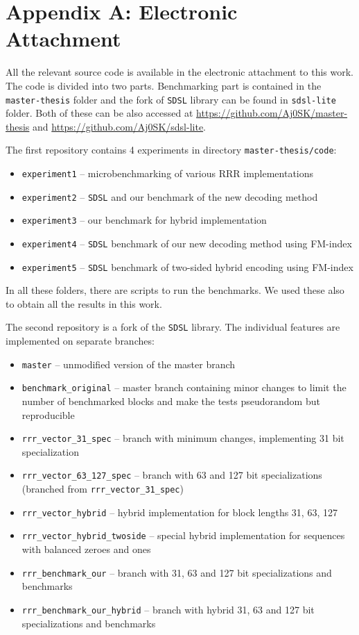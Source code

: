 \chapter*{Appendix A: Electronic Attachment}
\label{kap:kapAppendixA}

All the relevant source code is available in the electronic attachment to this work.
The code is divided into two parts. Benchmarking part is contained in the \verb!master-thesis!
folder and the fork of \texttt{SDSL} library can be found in \verb!sdsl-lite! folder.
Both of these can be also accessed at \url{https://github.com/Aj0SK/master-thesis} and
\url{https://github.com/Aj0SK/sdsl-lite}.

The first repository contains 4 experiments in directory \texttt{master-thesis/code}:
\begin{itemize}
    \item \texttt{experiment1} -- microbenchmarking of various RRR implementations
    \item \texttt{experiment2} -- \texttt{SDSL} and our benchmark of the new decoding method
    \item \texttt{experiment3} -- our benchmark for hybrid implementation
    \item \texttt{experiment4} -- \texttt{SDSL} benchmark of our new decoding method using FM-index
    \item \texttt{experiment5} -- \texttt{SDSL} benchmark of two-sided hybrid encoding using FM-index
\end{itemize}
In all these folders, there are scripts to run the benchmarks. We used these also to obtain
all the results in this work. 

The second repository is a fork of the \texttt{SDSL} library. The individual features are implemented
on separate branches:
\begin{itemize}
    \item \texttt{master} -- unmodified version of the master branch
    \item \texttt{benchmark\_original} -- master branch containing minor changes
        to limit the number of benchmarked blocks and make the tests pseudorandom but reproducible
    \item \texttt{rrr\_vector\_31\_spec} -- branch with minimum changes, implementing 31 bit specialization
    \item \texttt{rrr\_vector\_63\_127\_spec} -- branch with 63 and 127 bit specializations (branched from \texttt{rrr\_vector\_31\_spec})
    \item \texttt{rrr\_vector\_hybrid} -- hybrid implementation for block lengths 31, 63, 127
    \item \texttt{rrr\_vector\_hybrid\_twoside} -- special hybrid implementation for sequences with balanced zeroes and ones
    \item \texttt{rrr\_benchmark\_our} -- branch with 31, 63 and 127 bit specializations and benchmarks
    \item \texttt{rrr\_benchmark\_our\_hybrid} -- branch with hybrid 31, 63 and 127 bit specializations and benchmarks
\end{itemize}

